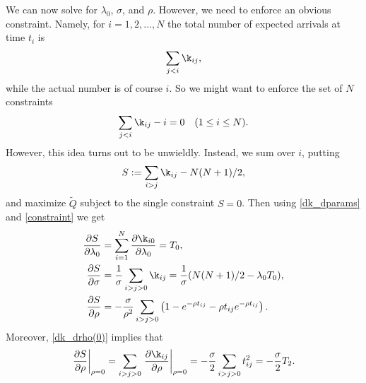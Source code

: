 \documentclass[12pt,leqno]{article}
\begin{document}
We can now solve for $\lambda_0$, $\sigma$, and $\rho$.  However, we
need to enforce an obvious constraint.  Namely,
for $i = 1,2,\dots,N$ the total number of expected arrivals at time $t_i$ is 
$$
\sum_{j<i}\k_{ij},
$$
while the actual number is of course $i$.  So we might want to enforce
the set of $N$ constraints
$$
\sum_{j < i}\k_{ij} - i = 0 \quad(1\le i\le N).
$$
However, this idea turns out to be unwieldly.  Instead, we sum over $i$, putting
\begin{equation}\label{constraint}
S := \sum_{i>j}\k_{ij} - N(N+1)/2,
\end{equation}
and maximize $\tilde{Q}$ subject to the single constraint $S = 0$.
Then using \eqref{dk_dparams} and \eqref{constraint} we get
\begin{equation} \label{dS_dparams}
  \begin{split}
    \frac{\partial{S}}{\partial\lambda_0} &= \sum_{i=1}^N\frac{\partial \k_{i0}}{\partial\lambda_0} = T_0,\\
    \frac{\partial{S}}{\partial\sigma} &= \frac{1}{\sigma}\sum_{i>j>0}\k_{ij} = \frac{1}{\sigma}(N(N+1)/2 - \lambda_0T_0),\\
    \frac{\partial{S}}{\partial\rho} &= -\frac{\sigma}{\rho^2}\sum_{i>j>0}\left(1-e^{-\rho t_{ij}}-\rho t_{ij}e^{-\rho t_{ij}}\right).
  \end{split}
\end{equation}
Moreover, \eqref{dk_drho(0)} implies that
\begin{equation}\label{dS_drho(0)}
  \left.\frac{\partial S}{\partial\rho}\right|_{\rho=0} = \sum_{i>j>0}\left.\frac{\partial\k_{ij}}{\partial\rho}\right|_{\rho=0}
  = -\frac{\sigma}{2}\sum_{i>j>0}t_{ij}^2 = -\frac{\sigma}{2}T_2.
\end{equation}
\end{document}
